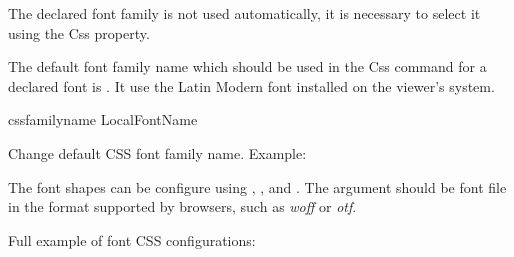

The declared font family is not used automatically, it is necessary to select
it using the  Css property.

The default font family name which should be used in the Css
 command for a declared font is . 
It use the Latin Modern font installed on the viewer's system. 

 {cssfamilyname} {LocalFontName}\EndDoc

Change default CSS font family name. Example:

\begin{texsource}
\end{texsource}

The font shapes can be configure using , 
,  and
. The argument should be font file in the format
supported by browsers, such as \textit{woff} or \textit{otf}.

Full example of font CSS configurations:

\begin{texsource}
\end{texsource}
